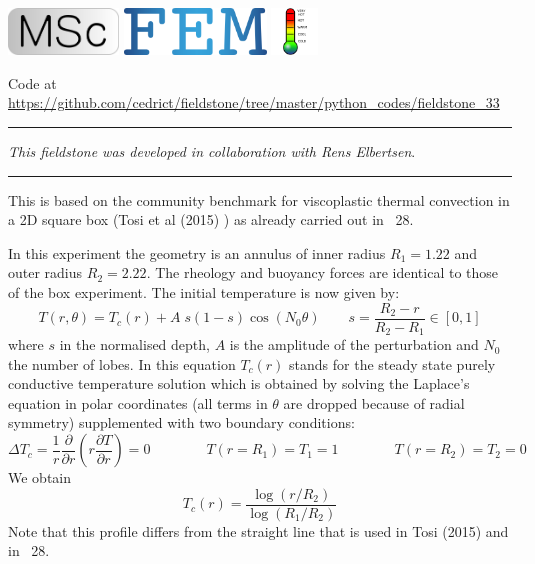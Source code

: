 \includegraphics[height=1.25cm]{images/pictograms/msc}
\includegraphics[height=1.25cm]{images/pictograms/FEM}
\includegraphics[height=1.25cm]{images/pictograms/temperature}





\begin{center}
Code at \url{https://github.com/cedrict/fieldstone/tree/master/python_codes/fieldstone_33}
\end{center}

\par\noindent\rule{\textwidth}{0.4pt}

{\sl This fieldstone was developed in collaboration with Rens Elbertsen}. 

\par\noindent\rule{\textwidth}{0.4pt}



This is based on the community benchmark for viscoplastic thermal convection
in a 2D square box (Tosi et al (2015) \cite{tosn15}) as already carried out in \stone~28.

In this experiment the geometry is an annulus of inner radius 
$R_1=1.22$ and outer radius $R_2=2.22$. 
The rheology and buoyancy forces are identical to those of the box 
experiment. The initial temperature is now given by:
\[
T(r,\theta) = T_c(r)+A\; s(1-s) \cos(N_0 \theta)
\quad\quad s=\frac{R_2-r}{R_2-R_1} \in [0,1]
\]
where $s$ in the normalised depth, $A$ is the amplitude of the perturbation and $N_0$ the 
number of lobes. In this equation $T_c(r)$ stands for the steady state purely conductive 
temperature solution which is obtained by solving the Laplace's equation in 
polar coordinates (all terms in $\theta$ are dropped because of radial symmetry) 
supplemented with two boundary conditions:
\[
\Delta T_c = \frac{1}{r}\frac{\partial }{\partial r} \left( r \frac{\partial T}{\partial r} \right) =0 
\quad\quad
\quad\quad
T(r=R_1)=T_1=1
\quad\quad
\quad\quad
T(r=R_2)=T_2=0
\]
We obtain 
\[
T_c(r)=\frac{\log (r/R_2)}{\log(R_1/R_2)}
\]
Note that this profile differs from the straight line that is used in Tosi \etal (2015) \cite{tosn15} 
and in \stone~28.

